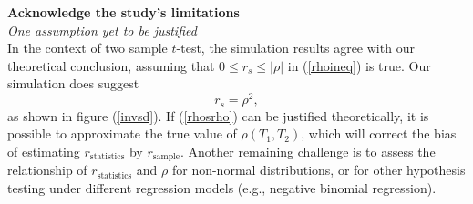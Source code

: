 \documentclass[12pt, a4paper]{article}
\begin{document}
	\textbf{	Acknowledge the study’s limitations \\}
	\textit{One assumption yet to be justified}\\
	In the context of two sample $t$-test, the simulation results agree with our theoretical
	conclusion, assuming that  $0\leq r_s \leq |\rho|$ in (\ref{rhoineq}) is true. Our simulation does
	suggest 
	\begin{equation}\label{rhosrho}
		r_s = \rho^2, 
	\end{equation}
	as shown in figure (\ref{invsd}). If (\ref{rhosrho}) can be justified theoretically, it is possible
	to approximate the true value of $\rho(T_1, T_2)$, which will correct the bias of estimating
	$r_\text{statistics}$ by $r_\text{sample}$. Another remaining challenge is to assess the
	relationship of $r_\text{statistics}$  and $\rho$ for non-normal distributions, or for other
	hypothesis testing under different regression models (e.g., negative binomial regression).  
	
	
	
	\newpage

	
	
	
	
\end{document}
